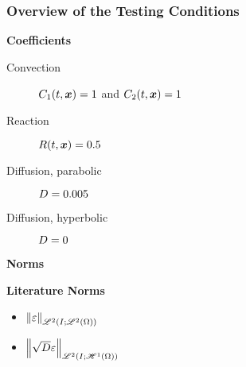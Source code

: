 \begin{frame}
    \frametitle{Overview of the Testing Conditions}

    \vspace*{\fill}
    \begin{center}
        {\color{\accentcolor} \Large \textbf{Coefficients}}
        \vspace*{0.5cm}

        \begin{minipage}{0.75\textwidth}
            \begin{description}
                \item[Convection] $C_1(t, \bm{x}) = 1$ and $C_2(t, \bm{x}) = 1$
                \item[Reaction] $R(t, \bm{x}) = 0.5$ 
                \item[Diffusion, parabolic] $D = 0.005$
                \item[Diffusion, hyperbolic] $D = 0$
            \end{description}
        \end{minipage}
    \end{center}

    \vspace*{\fill}

    \begin{center}
        {\color{\accentcolor} \Large \textbf{Norms}}
    \end{center}

    \begin{multicols}{2}

        \begin{center}
            {\color{\accentcolor} \Large \textbf{Literature Norms}}
            \vspace*{0.5cm}

            \begin{minipage}{0.4\textwidth}
                \begin{itemize}
                    \item $\left\lVert \varepsilon \right\rVert_{\mathscr{L}^{2}(I; \mathscr{L}^{2}(\Omega))}$
                    \item {\color{\accentcolor} $\left\lVert \sqrt{D} \varepsilon \right\rVert_{\mathscr{L}^{2}(I; \mathscr{H}^{1}(\Omega))}$}
                \end{itemize}
            \end{minipage}
        \end{center}


\end{multicols}
\end{frame}
